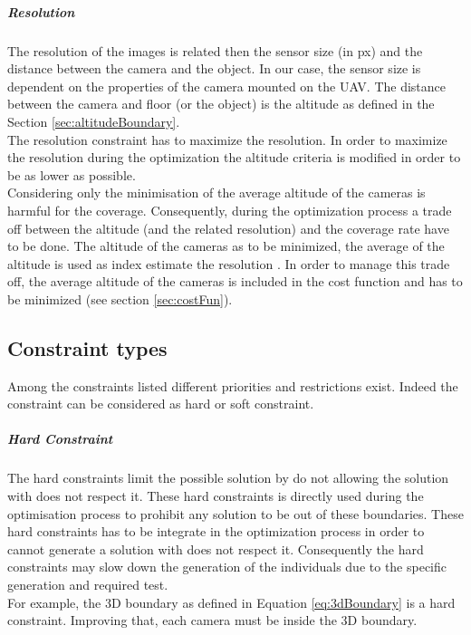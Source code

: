 \subparagraph{Resolution}
The resolution of the images is related then the sensor size (in px) and the distance between the camera and the object. In our case, the sensor size is dependent on the properties of the camera mounted on the UAV.%
 The distance between the camera and floor (or the object) is the altitude as  defined in the Section \ref{sec:altitudeBoundary}. \\
The resolution constraint has to maximize the resolution. In order to maximize the resolution during the optimization the altitude criteria is modified in order to be as lower as possible.\\
Considering only the minimisation of the average altitude of the cameras is harmful for the coverage.
Consequently, during the optimization process a trade off between the altitude (and the related resolution) and the coverage rate have to be done.
 The altitude of the cameras  as to be  minimized, the average of the altitude is used as index estimate the resolution  %
 . In order to manage this trade off, the average altitude of the cameras is included in the cost function  and has to be minimized (see section  \ref{sec:costFun}).  \\
 
\subsection{Constraint types} \label{sec:ConstraintTypesSoftHard}
 
Among the constraints listed different priorities and restrictions exist. Indeed the constraint can be considered as hard or soft constraint. %

\subparagraph{Hard Constraint}
 The hard constraints limit the possible solution by do not allowing the solution with does not respect it. These hard constraints is directly used during the optimisation process to prohibit any solution to be out of these boundaries. These hard constraints has to be integrate in the optimization process in order to cannot generate a solution with does not respect it. Consequently the hard constraints may slow down the generation of the individuals due to the specific generation and required test.\\ 
 For example, the 3D boundary as defined in Equation \ref{eq:3dBoundary} is a hard constraint. Improving that, each camera must be inside the 3D boundary.\\ %
 
